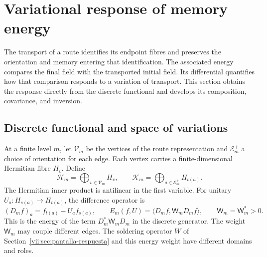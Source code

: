 
\section{Variational response of memory energy}
\label{vii:sec:variacion-memoria}

The transport of a route identifies its endpoint fibres and preserves
the orientation and memory entering that identification. The associated energy
compares the final field with the transported initial field. Its
differential quantifies how that comparison responds to a variation of
transport. This section obtains the response directly from the discrete
functional and develops its composition, covariance, and inversion.

\subsection{Discrete functional and space of variations}
\label{vii:subsec:funcional-memoria}

At a finite level \(m\), let \(\mathcal V_m\) be the vertices of the
route representation and \(\mathcal E_m^+\) a choice of orientation for each edge.
Each vertex carries a finite-dimensional Hermitian fibre \(H_v\).
Define
\[
 \mathcal H_m=\bigoplus_{v\in\mathcal V_m}H_v,\qquad
 \mathcal K_m=\bigoplus_{a\in\mathcal E_m^+}H_{t(a)}.
\]
The Hermitian inner product is antilinear in the first variable.
For unitary \(U_a:H_{s(a)}\to H_{t(a)}\), the difference operator is
\begin{equation}
 (D_mf)_a=f_{t(a)}-U_af_{s(a)},\qquad
 E_m(f,U)=\langle D_mf,\mathsf W_mD_mf\rangle,\qquad
 \mathsf W_m=\mathsf W_m^*>0.
 \label{vii:eq:energia-memoria-discreta}
\end{equation}
This is the energy of the term \(D_m^*\mathsf W_mD_m\) in the discrete generator.
The weight \(\mathsf W_m\) may couple different edges. The soldering operator \(W\)
of Section~\ref{vii:sec:pantalla-respuesta} and this energy
weight have different domains and roles.

